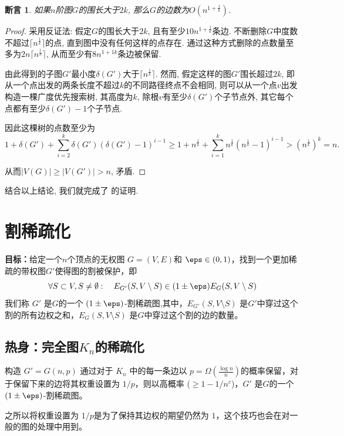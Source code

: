 \documentclass[lang=cn,newtx,10pt,scheme=chinese,chinesefont=nofont,citestyle=gb7714-2015, bibstyle=gb7714-2015]{elegantbook}
\newtheorem{claim}{断言}[chapter]   %
\begin{document}
\begin{refsection}
\begin{claim}
    如果$n$阶图$G$的围长大于$2k$, 那么$G$的边数为$O(n^{1+\frac{1}{k}})$.
\end{claim}

\begin{proof}
    采用反证法: 假定$G$的围长大于$2k$, 且有至少$10n^{1+\frac{1}{k}}$条边. 不断删除$G$中度数不超过$\lceil n^\frac{1}{k}\rceil$的点, 直到图中没有任何这样的点存在. 通过这种方式删除的点数量至多为$2n\lceil n^\frac{1}{k}\rceil$, 从而至少有$8n^{1+{1}{k}}$条边被保留.

    由此得到的子图$G'$最小度$\delta(G')$大于$\lceil n^{\frac{1}{k}}\rceil$. 然而, 假定这样的图$G'$围长超过$2k$, 即从一个点出发的两条长度不超过$k$的不同路径终点不会相同, 则可以从一个点$v$出发构造一棵广度优先搜索树, 其高度为$k$, 除根$v$有至少$\delta(G')$个子节点外, 其它每个点都有至少$\delta(G
    ')-1$个子节点.

    因此这棵树的点数至少为
    \[
    1+\delta(G')+\sum_{i=2}^k \delta(G')(\delta(G')-1)^{i-1}\geq1+n^{
    \frac{1}{k}}+\sum_{i=1}^k n^{
    \frac{1}{k}}(n^{
    \frac{1}{k}}-1)^{i-1}>(n^{\frac{1}{k}})^k=n.
    \]
    
    从而$|V(G)|\geq|V(G')|>n$, 矛盾.
\end{proof}

结合以上结论, 我们就完成了  的证明.




\section{割稀疏化}
\textbf{目标：}给定一个$n$个顶点的无权图 $G=(V,E)$和 $\eps\in(0,1)$，找到一个更加稀疏的带权图$G'$使得图的割被保护，即
\[
\forall S\subset V,S\neq \emptyset:\quad E_{G'}(S,V\setminus S)\in(1\pm\eps) E_G(S,V\setminus S)
\]
我们称 $G'$ 是$G$的一个 $(1\pm\eps)$-割稀疏图,其中，$E_{G'}(S,V\setminus S)$ 是$G'$中穿过这个割的所有边权之和，$E_{G}(S,V\setminus S)$ 是$G$中穿过这个割的边的数量。

\subsection{热身：完全图\texorpdfstring{$K_n$}{Kn}的稀疏化}
构造 $G'=G(n,p)$ 通过对于 $K_n$ 中的每一条边以 $p=\Omega(\frac{\log n}{n})$的概率保留，对于保留下来的边将其权重设置为 $1/p$，则以高概率 ($\geq 1-1/n^c$)，$G'$ 是$G$的一个 $(1\pm\eps)$-割稀疏图。

之所以将权重设置为 $1/p$是为了保持其边权的期望仍然为 $1$，这个技巧也会在对一般的图的处理中用到。


\end{refsection}
\end{document}

